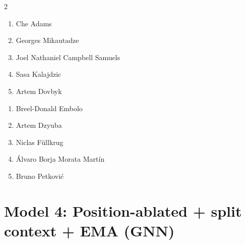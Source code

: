 \documentclass[11pt]{article}
\begin{document}
\begin{multicols}{2}
\begin{samepage}
\begin{tcolorbox}[evalbox,title=\textbf{Lionel Messi (Right Center Forward)} \hfill Score:\ \rule{1cm}{0.4pt}]
\begin{enumerate}
\item Che Adams
\item Georges Mikautadze
\item Joel Nathaniel Campbell Samuels
\item Sasa Kalajdzic
\item Artem Dovbyk
\end{enumerate}
\end{tcolorbox}
\end{samepage}

\begin{samepage}
\begin{tcolorbox}[evalbox,title=\textbf{Kylian Mbappé (Left Wing)} \hfill Score:\ \rule{1cm}{0.4pt}]
\begin{enumerate}
\item Breel-Donald Embolo
\item Artem Dzyuba
\item Niclas Füllkrug
\item Álvaro Borja Morata Martín
\item Bruno Petković
\end{enumerate}
\end{tcolorbox}
\end{samepage}

\end{multicols}

\section*{Model 4: Position-ablated + split context + EMA (GNN)}
\end{document}
